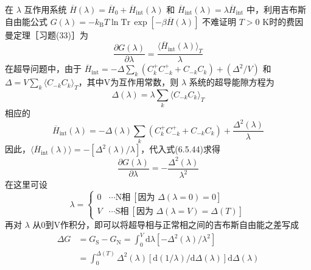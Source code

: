 在 $\lambda$ 互作用系统 $\overline{H}(\lambda)=\overline{H}_{0}
+\overline{H}_{\mathrm{int}}(\lambda)$ 和 $\overline{H}_{\mathrm{int}}(\lambda)=\lambda\overline{H}_{\mathrm{int}}$ 中，利用吉布斯自由能公式 $G(\lambda)=-k_{\mathrm{B}}T\ln\mathrm{Tr}\,\exp\left[-\beta\overline{H}(\lambda)\right]$ 不难证明 $T>0$ K时的费因曼定理［习题(33)］为
\begin{equation}
  \frac{\partial G(\lambda)}{\partial\lambda}
  =\frac{\langle\overline{H}_{\mathrm{int}}(\lambda)\rangle_{T}}{\lambda}
\end{equation}
在超导问题中，由于 $\overline{H}_{\mathrm{int}}
=-\Delta\sum_{k}\left(C^{+}_{k}C^{+}_{-k}+C_{-k}C_{k}\right)
+\left(\Delta^{2}/V\right)$ 和 $\Delta=V\sum_{k}\langle C_{-k}C_{k}\rangle_{T}$，其中V为互作用常数，则 $\lambda$ 系统的超导能隙方程为
\begin{equation}
  \Delta(\lambda)=\lambda\sum_{k}\langle C_{-k}C_{k}\rangle_{T}
\end{equation}
相应的
\begin{equation}
  \overline{H}_{\mathrm{int}}(\lambda)=-\Delta(\lambda)\sum_{k}
  \left(C^{+}_{k}C^{+}_{-k}+C_{-k}C_{k}\right)
  +\frac{\Delta^{2}(\lambda)}{\lambda}
\end{equation}
因此，$\langle\overline{H}_{\mathrm{int}}(\lambda)\rangle
=-\left[\Delta^{2}(\lambda)/\lambda\right]$，代入式(6.5.44)求得
\begin{equation}
  \frac{\partial G(\lambda)}{\partial\lambda}
  =-\frac{\Delta^{2}(\lambda)}{\lambda^{2}}
\end{equation}
在这里可设
\begin{equation}
  \lambda=\begin{cases}
    0 & \cdots\text{N相}\ \left[\text{因为 }\Delta(\lambda=0)=0\right]\\
    V & \cdots\text{S相}\ \left[\text{因为 }\Delta(\lambda=V)=\Delta(T)\right]
  \end{cases}
\end{equation}
再对 $\lambda$ 从0到V作积分，即可以将超导相与正常相之间的吉布斯自由能之差写成
\begin{equation}
\begin{aligned}
  \Delta G&=G_{\mathrm{S}}-G_{\mathrm{N}}
  =\int_{0}^{V}\mathrm{d}\lambda\left[-\Delta^{2}(\lambda)/\lambda^{2}\right]\\
  &=\int_{0}^{\Delta(T)}\Delta^{2}(\lambda)
  \left[\mathrm{d}(1/\lambda)/\mathrm{d}\Delta(\lambda)\right]
  \mathrm{d}\Delta(\lambda)
\end{aligned}
\end{equation}
